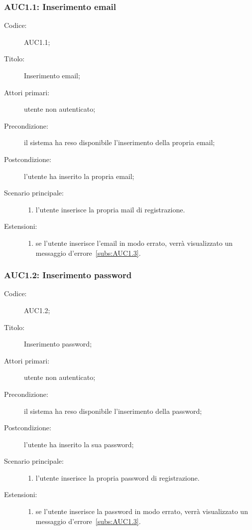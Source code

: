 \documentclass[../../../analisi-dei-requisiti.tex]{subfiles}
\begin{document}
\subsubsection{AUC1.1: Inserimento email}%
\label{subs:AUC1.1}
\begin{description}
  \item[Codice:] AUC1.1;
  \item[Titolo:] Inserimento email;
  \item[Attori primari:] utente non autenticato;
  \item[Precondizione:] il sistema ha reso disponibile l'inserimento della propria email;
  \item[Postcondizione:] l'utente ha inserito la propria email;
  \item[Scenario principale:]
  \begin{enumerate}
    \item l'utente inserisce la propria mail di registrazione.
  \end{enumerate}
  \item[Estensioni:]
  \begin{enumerate}
    \item se l'utente inserisce l'email in modo errato, verrà visualizzato un messaggio d'errore~\ref{subs:AUC1.3}.
  \end{enumerate}
\end{description}

\subsubsection{AUC1.2: Inserimento password}%
\label{subs:AUC1.2}
\begin{description}
  \item[Codice:] AUC1.2;
  \item[Titolo:] Inserimento password;
  \item[Attori primari:] utente non autenticato;
  \item[Precondizione:] il sistema ha reso disponibile l'inserimento della password;
  \item[Postcondizione:] l'utente ha inserito la sua password;
  \item[Scenario principale:]
  \begin{enumerate}
    \item l'utente inserisce la propria password di registrazione.
  \end{enumerate}
  \item[Estensioni:]
  \begin{enumerate}
    \item se l'utente inserisce la password in modo errato, verrà visualizzato un messaggio d'errore~\ref{subs:AUC1.3}.
  \end{enumerate}
\end{description}
\end{document}
